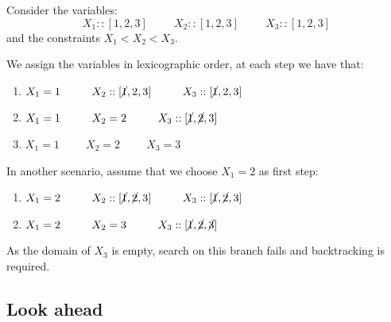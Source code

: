 \begin{example}
    Consider the variables: 
    \[ X_1 :: [1, 2, 3] \hspace{1cm} X_2 :: [1, 2, 3] \hspace{1cm} X_3 :: [1, 2, 3] \]
    and the constraints $X_1 < X_2 < X_3$.

    We assign the variables in lexicographic order, at each step we have that:
    \begin{enumerate}
        \item $X_1 = 1 \hspace{1cm} X_2 :: [\cancel{1}, 2, 3] \hspace{1cm} X_3 :: [\cancel{1}, 2, 3]$
        \item $X_1 = 1 \hspace{1cm} X_2 = 2 \hspace{1cm} X_3 :: [\cancel{1}, \cancel{2}, 3]$
        \item $X_1 = 1 \hspace{1cm} X_2 = 2 \hspace{1cm} X_3 = 3$
    \end{enumerate}

    In another scenario, assume that we choose $X_1 = 2$ as first step:
    \begin{enumerate}
        \item $X_1 = 2 \hspace{1cm} X_2 :: [\cancel{1}, \cancel{2}, 3] \hspace{1cm} X_3 :: [\cancel{1}, \cancel{2}, 3]$
        \item $X_1 = 2 \hspace{1cm} X_2 = 3 \hspace{1cm} X_3 :: [\cancel{1}, \cancel{2}, \cancel{3}]$
    \end{enumerate}
    As the domain of $X_3$ is empty, search on this branch fails and backtracking is required.
\end{example}



\subsection{Look ahead}

